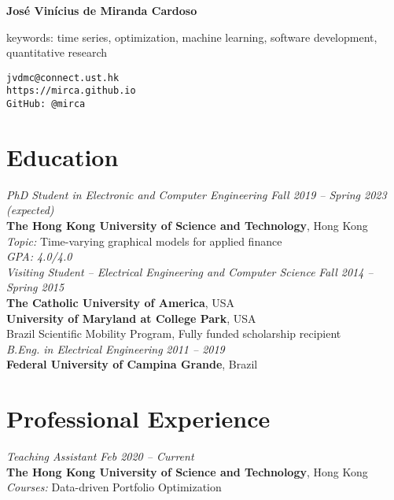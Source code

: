 \documentclass[10pt]{article}
\begin{document}
\pagestyle{empty}
\begin{titlepage}
     {\Large{\textbf{Jos\'e Vin\'icius de Miranda Cardoso}}}
     \vspace{.5cm}

    \begin{minipage}[b]{9cm}
      keywords: time series, optimization, machine learning, software development, quantitative research\\
    \end{minipage}
    \hfill
    \begin{minipage}[b]{4cm}
        \hfill \texttt{jvdmc@connect.ust.hk}\\
        \texttt{https://mirca.github.io}\\
        \texttt{GitHub: @mirca}
    \end{minipage}


\section*{Education}

\emph{PhD Student in Electronic and Computer Engineering} \hfill \textit{Fall 2019 -- Spring 2023 (expected)} \\
\textbf{The Hong Kong University of Science and Technology}, Hong Kong\\
\textit{Topic:} Time-varying graphical models for applied finance\\
\textit{GPA: 4.0/4.0}\\

\emph{Visiting Student -- Electrical Engineering and Computer Science} \hfill \textit{Fall 2014 -- Spring 2015} \\
\textbf{The Catholic University of America}, USA\\
\textbf{University of Maryland at College Park}, USA \\
Brazil Scientific Mobility Program, Fully funded scholarship recipient \\

\emph{B.Eng. in Electrical Engineering} \hfill \textit{2011 -- 2019} \\
\textbf{Federal University of Campina Grande}, Brazil

\section*{Professional Experience}
\emph{Teaching Assistant} \hfill \textit{Feb 2020 -- Current}
\\ \textbf{The Hong Kong University of Science and Technology}, Hong Kong
\\ {\small\textit{Courses:} Data-driven Portfolio Optimization}
\vspace{.5cm}


\end{titlepage}
\end{document}
